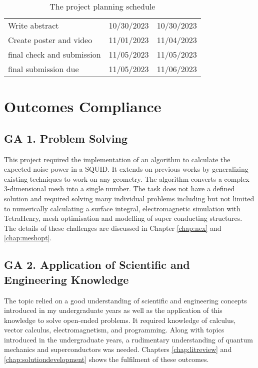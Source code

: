 \begin{table}[H]
\begin{tabular}{lll}
        Write abstract                                       & 10/30/2023          & 10/30/2023        \\
        Create poster and video                              & 11/01/2023          & 11/04/2023        \\
        final check and submission                           & 11/05/2023          & 11/05/2023        \\
        final submission due                                 & 11/05/2023          & 11/06/2023        \\ \hline
        \end{tabular}
        \caption{The project planning schedule}
        \label{tab:pps}
    \end{table}


\chapter{Outcomes Compliance}
\makeatletter{}\makeatother
\label{appen:OC}

\section{GA 1. Problem Solving}
This project required the implementation of an algorithm to calculate the expected noise power in a SQUID. It extends on previous works by generalizing existing techniques to work on any geometry. The algorithm converts a complex 3-dimensional mesh into a single number. The task does not have a defined solution and required solving many individual problems including but not limited to numerically calculating a surface integral, electromagnetic simulation with TetraHenry, mesh optimisation and modelling of super conducting structures. The details of these challenges are discussed in Chapter \ref{chap:nex} and \ref{chap:meshopt}.

\section{GA 2. Application of Scientific and Engineering Knowledge}
The topic relied on a good understanding of scientific and engineering concepts introduced in my undergraduate years as well as the application of this knowledge to solve open-ended problems. It required knowledge of calculus, vector calculus, electromagnetism, and programming. Along with topics introduced in the undergraduate years, a rudimentary understanding of quantum mechanics and superconductors was needed. Chapters \ref{chap:litreview} and \ref{chap:solutiondevelopment} shows the fulfilment of these outcomes.
